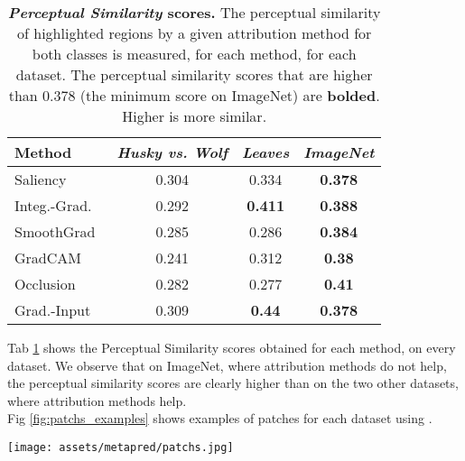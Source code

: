 \begin{table}[h]
\vspace{2mm}
\centering
\begin{tabular}{lccc}
\toprule
 Method & \textit{Husky vs. Wolf} & \textit{Leaves} & \textit{ImageNet} \\
\midrule
Saliency~\cite{simonyan2014deep}                  & 0.304 & 0.334 & \textbf{0.378} \\ 
Integ.-Grad.~\cite{sundararajan2017axiomatic}     & 0.292 & \textbf{0.411} & \textbf{0.388} \\
SmoothGrad~\cite{smilkov2017smoothgrad}           & 0.285 & 0.286 & \textbf{0.384} \\
GradCAM~\cite{selvaraju2017gradcam}               & 0.241 & 0.312 & \textbf{0.38} \\
Occlusion~\cite{zeiler2014visualizing}            & 0.282 & 0.277 & \textbf{0.41} \\
Grad.-Input~\cite{shrikumar2017learning}               & 0.309 & \textbf{0.44} & \textbf{0.378} \\
\bottomrule
\end{tabular}
\vspace{2mm}
\caption{\textbf{\textit{Perceptual Similarity} scores.} The perceptual similarity of highlighted regions by a given attribution method for both classes is measured, for each method, for each dataset. The perceptual similarity scores that are higher than $0.378$ (the minimum score on ImageNet) are \textbf{bolded}. Higher is more similar.}
\label{tab:similarity}
\vspace{-2mm}
\end{table}
Tab \ref{tab:similarity} shows the Perceptual Similarity scores obtained for each method, on every dataset. We observe that on ImageNet, where attribution methods do not help, the perceptual similarity scores are clearly higher than on the two other datasets, where attribution methods help. \\
Fig \ref{fig:patchs_examples} shows examples of patches for each dataset using \expgc.

\begin{figure*}[ht]
    \texttt{[image: assets/metapred/patchs.jpg]}
    \caption{\textbf{Examples of extracted patches.} The perceptual similarity score is performed on the locations considered most important by the attribution methods. Examples of patches extracted for the three datasets with the \expgc~ method.}
    \label{fig:patchs_examples}
    \vspace{-4mm}
\end{figure*}
